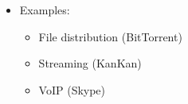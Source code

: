 \begin{itemize}
\begin{itemize}
      \item Examples:

        \begin{itemize}

          \item File distribution (BitTorrent)

          \item Streaming (KanKan)

          \item VoIP (Skype)

        \end{itemize}

    \end{itemize}

\end{itemize}



